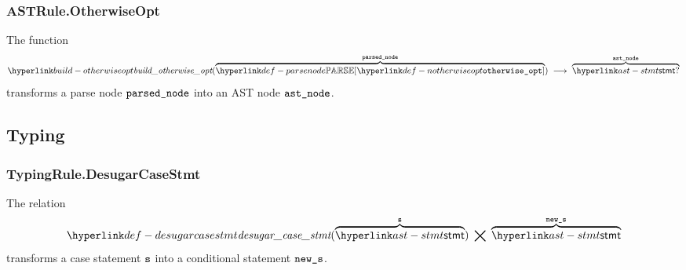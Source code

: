 \begin{mathpar}
\end{mathpar}

\subsubsection{ASTRule.OtherwiseOpt\label{sec:ASTRule.OtherwiseOpt}}
\hypertarget{build-otherwiseopt}{}
The function
\[
\buildotherwiseopt(\overname{\parsenode{\Notherwiseopt}}{\vparsednode}) \;\aslto\; \overname{\stmt?}{\vastnode}
\]
transforms a parse node $\vparsednode$ into an AST node $\vastnode$.

\begin{mathpar}
\end{mathpar}

\subsection{Typing}
\subsubsection{TypingRule.DesugarCaseStmt\label{sec:TypingRule.DesugarCaseStmt}}
\hypertarget{def-desugarcasestmt}{}
The relation
\[
\desugarcasestmt(\overname{\stmt}{\vs}) \;\aslrel\; \overname{\stmt}{\news}
\]
transforms a case statement $\vs$ into a conditional statement $\news$.

